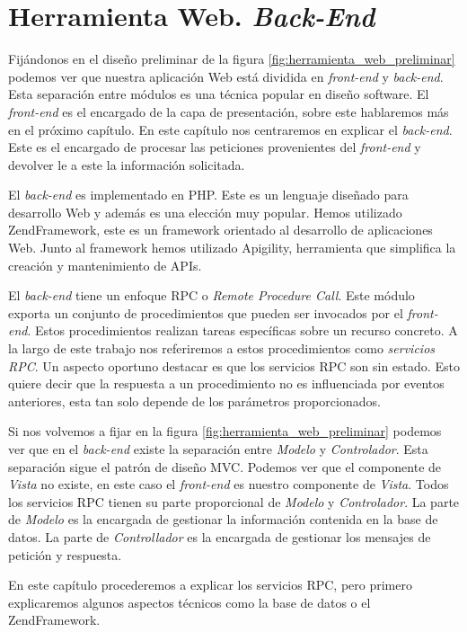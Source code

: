 \chapter{Herramienta Web. \emph{Back-End}}
\label{backend}

Fijándonos en el diseño preliminar de la figura \ref{fig:herramienta_web_preliminar} podemos ver que nuestra aplicación Web está dividida en
\emph{front-end} y \emph{back-end}. Esta separación entre módulos es una técnica popular en diseño software. El \emph{front-end} es el encargado de la
capa de presentación, sobre este hablaremos más en el próximo capítulo. En este capítulo nos centraremos en explicar el \emph{back-end}. Este es el
encargado de procesar las peticiones provenientes del \emph{front-end} y devolver le a este la información solicitada. 
\par
El \emph{back-end} es implementado en PHP\cite{PHP}. Este es un lenguaje diseñado para desarrollo Web y además es una elección muy popular. Hemos
utilizado ZendFramework\cite{ZF}, este es un framework orientado al desarrollo de aplicaciones Web. Junto al framework hemos utilizado
Apigility\cite{Apigility}, herramienta que simplifica la creación y mantenimiento de APIs.
\par
El \emph{back-end} tiene un enfoque RPC o \emph{Remote Procedure Call}. Este módulo exporta un conjunto de procedimientos que pueden ser invocados por
el \emph{front-end}. Estos procedimientos realizan tareas específicas sobre un recurso concreto. A la largo de este trabajo nos referiremos a estos
procedimientos como \emph{servicios RPC}. Un aspecto oportuno destacar es que los servicios RPC son sin estado. Esto quiere decir que la respuesta a
un procedimiento no es influenciada por eventos anteriores, esta tan solo depende de los parámetros proporcionados.
\par
Si nos volvemos a fijar en la figura \ref{fig:herramienta_web_preliminar} podemos ver que en el \emph{back-end} existe la separación entre
\emph{Modelo} y \emph{Controlador}. Esta separación sigue el patrón de diseño MVC\cite{MVCWiki}. Podemos ver que el componente de \emph{Vista} no
existe, en este caso el \emph{front-end} es nuestro componente de \emph{Vista}. Todos los servicios RPC tienen su parte proporcional de \emph{Modelo}
y \emph{Controlador}. La parte de \emph{Modelo} es la encargada de gestionar la información contenida en la base de datos. La parte de
\emph{Controllador} es la encargada de gestionar los mensajes de petición y respuesta.
\par
En este capítulo procederemos a explicar los servicios RPC, pero primero explicaremos algunos aspectos técnicos como la base de datos o el
ZendFramework.
